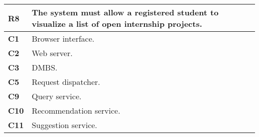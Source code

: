 \begin{table}[H]
    \centering
    \begin{tabular}{|l|m{10cm}|}
        \hline \textbf{R8} & The system must allow a registered student to visualize a list of open internship projects.\\
        \hline \textbf{C1} & Browser interface. \\
        \hline \textbf{C2} & Web server. \\
        \hline \textbf{C3} & DMBS. \\
        \hline \textbf{C5} & Request dispatcher. \\
        \hline \textbf{C9} & Query service. \\
        \hline \textbf{C10} & Recommendation service. \\
        \hline \textbf{C11} & Suggestion service. \\
        \hline
    \end{tabular}
\end{table}

